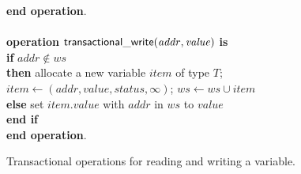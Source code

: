 \documentclass[11pt,letterpaper]{article}
\begin{document}
\begin{figure}
{{\begin{minipage}[t]{150mm}
\begin{tabbing}
{\bf end operation}. \\
\\
{\bf operation}  ${\sf transactional\_write}(\mathit{addr, value})$ {\bf is}\\
 \> {\bf if} $\mathit{addr} \not\in \mathit{ws}$  \\
 \>\> {\bf then} \> allocate a new variable $item$ of type $T$; \\
 \>\>\> $\mathit{item}  \gets (\mathit{addr, value, status, \infty})$; 
                   $\mathit{ws} \gets \mathit{ws} \cup \mathit{item}$ \\
 \>\> {\bf else} \> set $\mathit{item.value}$ with $\mathit{addr}$ in $\mathit{ws}$ to $\mathit{value}$ \\
 \> {\bf end if} \\
{\bf end operation}.
\end{tabbing}
\normalsize
\end{minipage}
}
\caption{Transactional operations for reading and writing a variable.}
\label{fig:tops2}
}
\end{figure}
\end{document}
